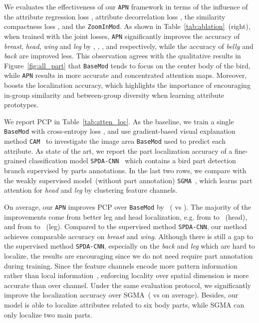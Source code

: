 We evaluates the effectiveness of our \texttt{APN} framework in terms of the influence of the attribute regression loss , attribute decorrelation loss , the similarity compactness loss , and the \texttt{ZoomInMod}. 
As shown in Table~\ref{tab:ablation}~(right), when trained with the joint losses, \texttt{APN} significantly improves the accuracy of \textit{breast}, \textit{head}, \textit{wing} and \textit{leg} by , , , and  respectively, while the accuracy of \textit{belly} and \textit{back} are improved less. This observation agrees with the qualitative results in Figure~\ref{fig:all_part} that \texttt{BaseMod} tends to focus on the center body of the bird, while \texttt{APN} results in more accurate and concentrated attention maps. 
Moreover,  boosts the localization accuracy, which highlights the importance of encouraging in-group similarity and between-group diversity when learning attribute prototypes.



We report PCP in Table~\ref{tab:atten_loc}.
As the baseline, we train a single \texttt{BaseMod} with cross-entropy loss , 
and use gradient-based visual explanation method \texttt{CAM}~\citep{CAM} to investigate the image area \texttt{BaseMod} used to predict each attribute. As state of the art, we report the part localization accuracy of a fine-grained classification model \texttt{SPDA-CNN}~\citep{spdacnn} which contains a bird part detection branch supervised by parts annotations. In the last two rows, we compare with the weakly supervised model~(without part annotation) \texttt{SGMA}~\citep{SGMA}, which learns part attention for \textit{head} and \textit{leg} by clustering feature channels.

On average, our \texttt{APN} improves PCP over \texttt{BaseMod} by ~( vs ). The majority of the improvements come from better leg and head localization, e.g. from  to ~(head), and from  to ~(leg). Compared to the supervised method \texttt{SPDA-CNN}, our method achieves comparable accuracy on \textit{breast} and \textit{wing}. Although there is still a gap to the supervised method \texttt{SPDA-CNN}, especially on the \textit{back} and \textit{leg} which are hard to localize, the results are encouraging since we do not need require part annotation during training.
Since the feature channels encode more pattern information rather than local information~\citep{geirhos2018imagenet,zhou2018interpreting}, enforcing locality over spatial dimension is more accurate than over channel. Under the same evaluation protocol, we significantly improve the localization accuracy over SGMA~( vs  on average). Besides, our model is able to localize attributes related to six body parts, while SGMA can only localize two main parts. 













